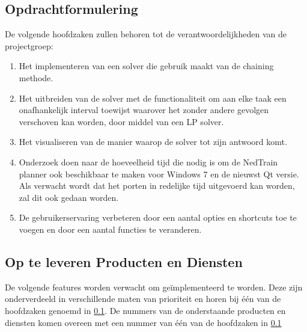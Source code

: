 \subsection{Opdrachtformulering}
\label{subsec:opdrachtformulering}
De volgende hoofdzaken zullen behoren tot de verantwoordelijkheden van de projectgroep:
\begin{enumerate}
	\item \label{enum:chaining} Het implementeren van een solver die gebruik maakt van de chaining methode.
	\item \label{enum:LP} Het uitbreiden van de solver met de functionaliteit om aan elke taak een onafhankelijk interval toewijst waarover het zonder andere gevolgen verschoven kan worden, door middel van een LP solver.
	\item \label{enum:visueel} Het visualiseren van de manier waarop de solver tot zijn antwoord komt.
	\item \label{enum:windows} Onderzoek doen naar de hoeveelheid tijd die nodig is om de NedTrain planner ook beschikbaar te maken voor Windows 7 en de nieuwst Qt versie. Als verwacht wordt dat het porten in redelijke tijd uitgevoerd kan worden, zal dit ook gedaan worden.
	\item \label{enum:gebruiker} De gebruikerservaring verbeteren door een aantal opties en shortcuts toe te voegen en door een aantal functies te veranderen.
\end{enumerate}

\subsection{Op te leveren Producten en Diensten}
\label{subsec:producten}
De volgende features worden verwacht om ge\"implementeerd te worden. Deze zijn onderverdeeld in verschillende maten van prioriteit en horen bij \'e\'en van de hoofdzaken genoemd in \ref{subsec:opdrachtformulering}. De nummers van de onderstaande producten en diensten komen overeen met een nummer van \'e\'en van de hoofdzaken in \ref{subsec:opdrachtformulering}

